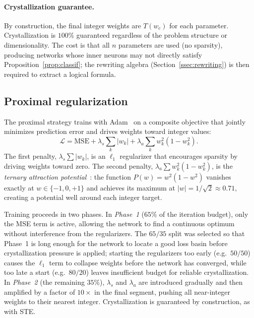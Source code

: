 \documentclass[10pt,a4paper,twoside]{article}
\begin{document}
\paragraph{Crystallization guarantee.}
By construction, the final integer weights are $T(w_c)$ for each parameter.
Crystallization is $100\%$ guaranteed regardless of the problem structure
or dimensionality.
The cost is that all $n$ parameters are used (no sparsity), producing
networks whose inner neurons may not directly satisfy
Proposition~\ref{prop:classif}; the rewriting algebra (Section~\ref{ssec:rewriting})
is then required to extract a logical formula.

\subsection{Proximal regularization}
\label{ssec:proximal}

The proximal strategy trains with Adam~\cite{kingma2015} on a composite
objective that jointly minimizes prediction error and drives weights toward
integer values:
\begin{equation}
  \mathcal{L} = \mathrm{MSE}
    + \lambda_s \sum_k |w_k|
    + \lambda_a \sum_k w_k^2(1 - w_k^2).
  \label{eq:proximal}
\end{equation}
The first penalty, $\lambda_s \sum|w_k|$, is an $\ell_1$ regularizer that
encourages sparsity by driving weights toward zero.
The second penalty, $\lambda_a \sum w_k^2(1-w_k^2)$, is the \emph{ternary
attraction potential}~\cite{parikh2014}: the function $P(w) = w^2(1-w^2)$
vanishes exactly at $w \in \{-1, 0, +1\}$ and achieves its maximum at
$|w| = 1/\sqrt{2} \approx 0.71$, creating a potential well around each
integer target.

Training proceeds in two phases.
In \emph{Phase~1} ($65\%$ of the iteration budget), only the MSE term is
active, allowing the network to find a continuous optimum without
interference from the regularizers.
The $65/35$ split was selected so that Phase~1 is long enough for the
network to locate a good loss basin before crystallization pressure is
applied; starting the regularizers too early (e.g.\ $50/50$) causes the
$\ell_1$ term to collapse weights before the network has converged, while
too late a start (e.g.\ $80/20$) leaves insufficient budget for reliable
crystallization.
In \emph{Phase~2} (the remaining $35\%$), $\lambda_s$ and $\lambda_a$ are
introduced gradually and then amplified by a factor of $10\times$ in the
final segment, pushing all near-integer weights to their nearest integer.
Crystallization is guaranteed by construction, as with STE.
\end{document}
